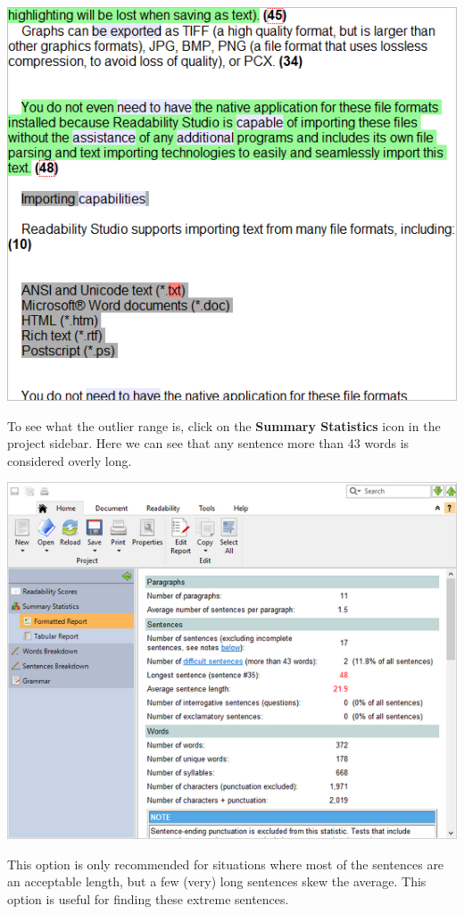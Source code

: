 \documentclass[
]{book}
\theoremstyle{definition}
\theoremstyle{definition}
\theoremstyle{definition}
\theoremstyle{definition}
\theoremstyle{remark}
\begin{document}
\begin{center}\includegraphics[width=0.75\linewidth,]{Images/featuressentencesoutliers} \end{center}

To see what the outlier range is, click on the \textbf{Summary Statistics} icon in the project sidebar. Here we can see that any sentence more than 43 words is considered overly long.

\includegraphics{Images/featuressentences43.png}

This option is only recommended for situations where most of the sentences are an acceptable length, but a few (very) long sentences skew the average. This option is useful for finding these extreme sentences.

\newpage
\end{document}
